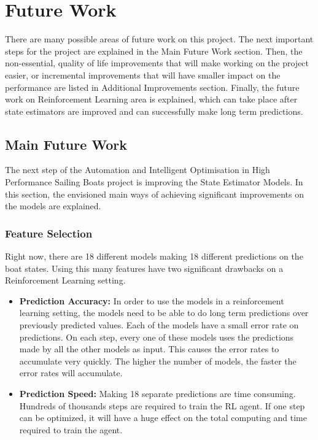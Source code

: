 \documentclass[12pt,twoside]{report}
\begin{document}
\section{Future Work} \label{sec:future-work}
There are many possible areas of future work on this project. The next important steps for the project are explained in the Main Future Work section. Then, the non-essential, quality of life improvements that will make working on the project easier, or incremental improvements that will have smaller impact on the performance are listed in Additional Improvements section. Finally, the future work on Reinforcement Learning area is explained, which can take place after state estimators are improved and can successfully make long term predictions.

\subsection{Main Future Work}
The next step of the Automation and Intelligent Optimisation in High Performance Sailing Boats project is improving the State Estimator Models. In this section, the envisioned main ways of achieving significant improvements on the models are explained.

\subsubsection{Feature Selection}
Right now, there are 18 different models making 18 different predictions on the boat states. Using this many features have two significant drawbacks on a Reinforcement Learning setting. 

\begin{itemize}
    \item \textbf{Prediction Accuracy:} In order to use the models in a reinforcement learning setting, the models need to be able to do long term predictions over previously predicted values. Each of the models have a small error rate on predictions. On each step, every one of these models uses the predictions made by all the other models as input. This causes the error rates to accumulate very quickly. The higher the number of models, the faster the error rates will accumulate.
    \item \textbf{Prediction Speed:} Making 18 separate predictions are time consuming. Hundreds of thousands steps are required to train the RL agent. If one step can be optimized, it will have a huge effect on the total computing and time required to train the agent.
\end{itemize}
\end{document}
